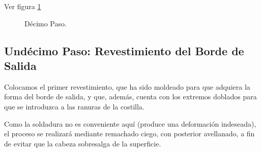 Ver figura \ref{fig:dec}

\begin{figure}[!htb]
\centering
{}
\caption{Décimo Paso. \label{fig:dec}}
\end{figure}


\subsection{Undécimo Paso: Revestimiento del Borde de Salida}
Colocamos el primer revestimiento, que ha sido moldeado para que adquiera la forma del borde de salida, y que, además, cuenta con los extremos doblados para que se introduzca a las ranuras de la costilla.

Como la soldadura no es conveniente aquí (produce una deformación indeseada), el proceso se realizará mediante remachado ciego, con posterior avellanado, a fin de evitar que la cabeza sobresalga de la superficie. 

